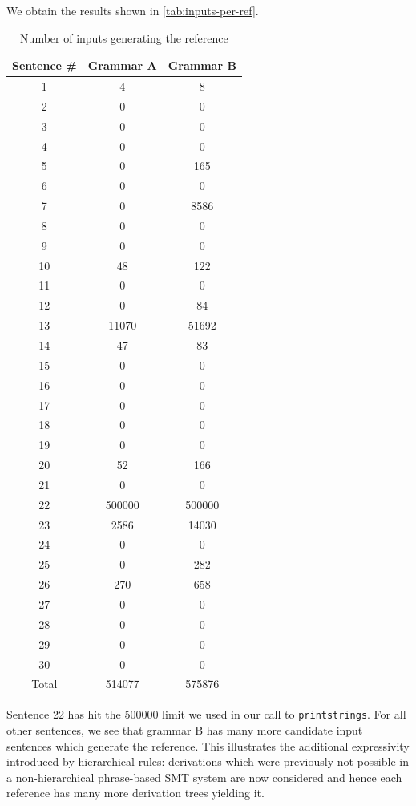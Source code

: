\documentclass[a4paper,oneside,reqno]{amsart}
\begin{document}
\begin{enumerate}[label=\arabic*.]
    We obtain the results shown in \autoref{tab:inputs-per-ref}.
    \begin{table}[H]
      \begin{tabular}{ccc}
        \toprule
        Sentence \# & Grammar A & Grammar B \\
        \midrule
        1 & 4 & 8 \\
        2 & 0 & 0 \\
        3 & 0 & 0 \\
        4 & 0 & 0 \\
        5 & 0 & 165 \\
        6 & 0 & 0 \\
        7 & 0 & 8586 \\
        8 & 0 & 0 \\
        9 & 0 & 0 \\
        10 & 48 & 122 \\
        11 & 0 & 0 \\
        12 & 0 & 84 \\
        13 & 11070 & 51692 \\
        14 & 47 & 83 \\
        15 & 0 & 0 \\
        16 & 0 & 0 \\
        17 & 0 & 0 \\
        18 & 0 & 0 \\
        19 & 0 & 0 \\
        20 & 52 & 166 \\
        21 & 0 & 0 \\
        22 & 500000 & 500000 \\
        23 & 2586 & 14030 \\
        24 & 0 & 0 \\
        25 & 0 & 282 \\
        26 & 270 & 658 \\
        27 & 0 & 0 \\
        28 & 0 & 0 \\
        29 & 0 & 0 \\
        30 & 0 & 0 \\
        \hline
        Total & 514077 & 575876 \\
        \bottomrule
      \end{tabular}
      \caption{Number of inputs generating the reference}
      \label{tab:inputs-per-ref}
    \end{table}
    Sentence 22 has hit the 500000 limit we used in our call to
    \texttt{printstrings}.  For all other sentences, we see that grammar B has
    many more candidate input sentences which generate the reference. This
    illustrates the additional expressivity introduced by hierarchical rules:
    derivations which were previously not possible in a non-hierarchical
    phrase-based SMT system are now considered and hence each reference has
    many more derivation trees yielding it.


\end{enumerate}
\end{document}
